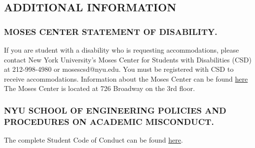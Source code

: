 \documentclass[10pt]{article}
\begin{document}
\subsection{ADDITIONAL INFORMATION}

\subsubsection{MOSES CENTER STATEMENT OF DISABILITY.}

If you are student with a disability who is requesting accommodations, please contact New York University's Moses Center for Students with Disabilities (CSD) at 212-998-4980 or mosescsd@nyu.edu.  You must be registered with CSD to receive accommodations.  Information about the Moses Center can be found \href{https://www.nyu.edu/students/communities-and-groups/students-with-disabilities.html}{here} The Moses Center is located at 726 Broadway on the 3rd floor.

\subsubsection{NYU SCHOOL OF ENGINEERING POLICIES AND PROCEDURES ON ACADEMIC MISCONDUCT.}
The complete Student Code of Conduct can be found \href{https://engineering.nyu.edu/campus-and-community/student-life/office-student-affairs/policies/student-code-conduct}{here}.
\end{document}

